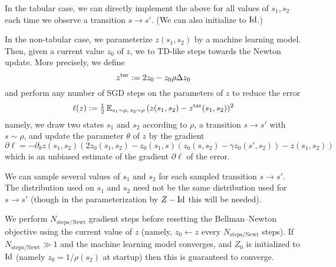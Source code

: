 \documentclass[11pt,a4paper]{article}
\newcommand{\ztar}{z^\mathrm{tar}}
\newcommand{\Nnewt}{N_\mathrm{steps/Newt}}
\begin{document}
In the tabular case, we can directly implement the above for all values
of $s_1,s_2$ each time we observe a transition $s\to s'$. (We can also
initialize to $\operatorname{Id}$.)

In the non-tabular case, we parameterize $z(s_1,s_2)$ by a machine
learning model. Then, given a current value $z_0$ of $z$, we to TD-like
steps towards the Newton update. More precisely, we define
\begin{equation}
\ztar\deq 2z_0-z_0\rho\Delta z_0
\end{equation}
and perform any number of SGD steps on the parameters of $z$ to reduce
the error 
\begin{equation}
\ell(z)\deq\tfrac12\, \E_{s_1\sim \rho,\,s_2\sim \rho}
\,(z(s_1,s_2)-\ztar(s_1,s_2))^2
\end{equation}
namely, we draw two states $s_1$ and
$s_2$ according to $\rho$, a transition $s\to s'$ with $s\sim \rho$, and
update the parameter $\theta$ of $z$
by the gradient
\begin{equation}
\partial\ell =-\partial_\theta z(s_1,s_2)\left(
2z_0(s_1,s_2)-z_0(s_1,s)\left(z_0(s,s_2)-\gamma z_0(s',s_2)\right)-z(s_1,s_2)
\right)
\end{equation}
which is an unbiased estimate of the gradient $\partial \ell$ of the error.

We can sample several values of $s_1$ and $s_2$ for each sampled
transition $s\to s'$.  The distribution used on $s_1$ and $s_2$ need not
be the same distribution used for $s\to s'$ (though in the
parameterization by $Z-\operatorname{Id}$ this will be needed).

We perform $\Nnewt$ gradient steps before resetting the Bellman--Newton
objective using the current value of $z$ (namely, $z_0\gets z$ every
$\Nnewt$ steps). If $\Nnewt\gg 1$ and the machine learning model
converges, and $Z_0$ is initialized to $\operatorname{Id}$ (namely $z_0=1/\rho(s_2)$ at
startup) then this is guaranteed to converge.
\end{document}
